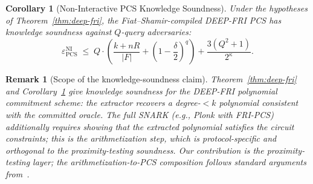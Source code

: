 \documentclass[11pt]{article}
\newtheorem{corollary}[theorem]{Corollary}
\newtheorem{remark}[theorem]{Remark}
\begin{document}
\begin{corollary}[Non-Interactive PCS Knowledge Soundness]
\label{cor:pcs-ni}
Under the hypotheses of Theorem~\ref{thm:deep-fri}, the Fiat--Shamir-compiled DEEP-FRI PCS has knowledge soundness against $Q$-query adversaries:
$$\varepsilon_{\mathrm{PCS}}^{\mathrm{NI}} \;\leq\; Q \cdot \left(\frac{k + nR}{|F|} + \left(1 - \frac{\delta}{2}\right)^q\right) + \frac{3(Q^2 + 1)}{2^\kappa}.$$
\end{corollary}

\begin{remark}[Scope of the knowledge-soundness claim]
\label{rem:ks-scope}
Theorem~\ref{thm:deep-fri} and Corollary~\ref{cor:pcs-ni} give knowledge soundness for the DEEP-FRI \emph{polynomial commitment scheme}: the extractor recovers a degree-${<}k$ polynomial consistent with the committed oracle.  The full SNARK (e.g., Plonk with FRI-PCS) additionally requires showing that the extracted polynomial satisfies the circuit constraints; this is the \emph{arithmetization} step, which is protocol-specific and orthogonal to the proximity-testing soundness.  Our contribution is the proximity-testing layer; the arithmetization-to-PCS composition follows standard arguments from~\cite{BGKTTW}.
\end{remark}
\end{document}
